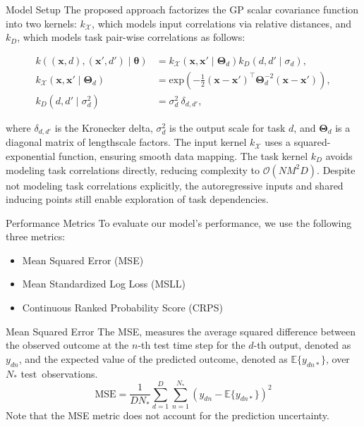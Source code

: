 \begin{frame}{Model Setup}
	The proposed approach factorizes the GP scalar covariance function into two kernels: $k_{\mathcal{X}}$, which models input correlations via relative distances, and $k_{D}$, which models task pair-wise correlations as follows:
	
	\begin{align}
	k\left((\bm{x}, d), (\bm{x}', d') \mid \bm{\theta}\right) &= k_{\mathcal{X}}\left(\bm{x}, \bm{x}' \mid \bm{\Theta}_d \right) k_{D}\left(d, d' \mid \sigma_d \right), \\
	k_{\mathcal{X}}\left(\bm{x}, \bm{x}' \mid \bm{\Theta}_d \right) &= \text{exp}\left(-\frac{1}{2}(\bm{x} - \bm{x}')^\top \bm{\Theta}_d^{-2} (\bm{x} - \bm{x}')\right), \\
	k_{D}\left(d, d' \mid \sigma^2_d \right) &= \sigma^2_d ~ \delta_{d, d'},
	\end{align}
	
	where $\delta_{d, d'}$ is the Kronecker delta, $\sigma^2_d$ is the output scale for task $d$, and $\bm{\Theta}_d$ is a diagonal matrix of lengthscale factors. The input kernel $k_{\mathcal{X}}$ uses a squared-exponential function, ensuring smooth data mapping. The task kernel $k_{D}$ avoids modeling task correlations directly, reducing complexity to $\mathcal{O}(N M^2 D)$. Despite not modeling task correlations explicitly, the autoregressive inputs and shared inducing points still enable exploration of task dependencies.
	
\end{frame}

\begin{frame}{Performance Metrics}
	To evaluate our model's performance, we use the following three metrics:
	\begin{itemize}
		\item Mean Squared Error (MSE)
		\item Mean Standardized Log Loss (MSLL)
		\item Continuous Ranked Probability Score (CRPS)
	\end{itemize}
\end{frame}

\begin{frame}{Mean Squared Error}
	The MSE, measures the average squared difference between the observed outcome at the $n$-th test time step for the $d$-th output, denoted as $y_{dn}$, and the expected value of the predicted outcome, denoted as $\mathbb{E}\{y_{dn*}\}$, over $N_*$ test~observations.
	\begin{equation}\label{eq:mse}
	\text{MSE} = \frac{1}{DN_{*}} \sum_{d=1}^{D} \sum_{n=1}^{N_*} (y_{dn} - \mathbb{E}\{y_{dn*}\})^2
	\end{equation}
	Note that the MSE metric does not account for the prediction uncertainty.
\end{frame}

